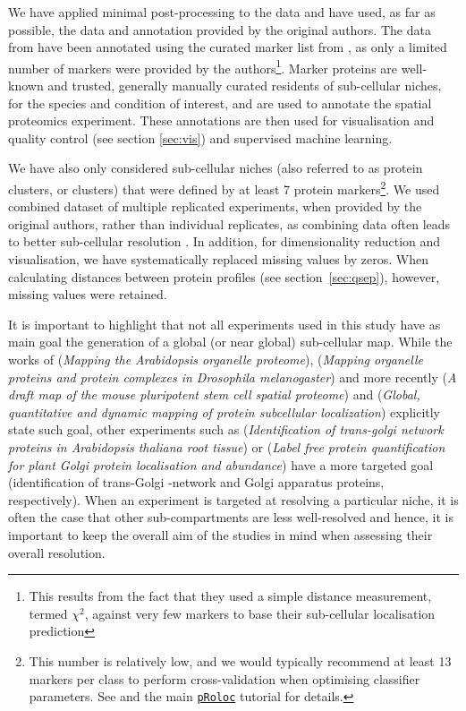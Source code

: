\documentclass[12pt]{article}\usepackage[]{graphicx}\usepackage[]{color}
\newcommand{\Rpackage}[1]{\texttt{#1}}
\newcommand\Biocpkg[1]{%
  {\href{http://bioconductor.org/packages/#1}%
    {\Rpackage{#1}}}}
\begin{document}
We have applied minimal post-processing to the data and have used, as
far as possible, the data and annotation provided by the original
authors. The data from \citet{Foster:2006} have been annotated using
the curated marker list from \citet{Christoforou:2016}, as only a
limited number of markers were provided by the authors\footnote{This
  results from the fact that they used a simple distance measurement,
  termed $\chi^2$, against very few markers to base their sub-cellular
  localisation prediction}. Marker proteins are well-known and
trusted, generally manually curated residents of sub-cellular niches,
for the species and condition of interest, and are used to annotate
the spatial proteomics experiment. These annotations are then used for
visualisation and quality control (see section \ref{sec:vis}) and
supervised machine learning.

We have also only considered sub-cellular niches (also referred to as
protein clusters, or clusters) that were defined by at least 7 protein
markers\footnote{This number is relatively low, and we would typically
  recommend at least 13 markers per class to perform cross-validation
  when optimising classifier parameters. See \citet{Gatto:2014} and
  the main \Biocpkg{pRoloc} tutorial for details.}. We used combined
dataset of multiple replicated experiments, when provided by the
original authors, rather than individual replicates, as combining data
often leads to better sub-cellular resolution \citep{Trotter:2010}.
In addition, for dimensionality reduction and visualisation, we have
systematically replaced missing values by zeros. When calculating
distances between protein profiles (see section~\ref{sec:qsep}),
however, missing values were retained.






It is important to highlight that not all experiments used in this
study have as main goal the generation of a global (or near global)
sub-cellular map. While the works of \citet{Dunkley:2006}
(\textit{Mapping the Arabidopsis organelle proteome}),
\citet{Tan:2009} (\textit{Mapping organelle proteins and protein
  complexes in Drosophila melanogaster}) and more recently
\citet{Christoforou:2016} (\textit{A draft map of the mouse
  pluripotent stem cell spatial proteome}) and \citet{Itzhak:2016}
(\textit{Global, quantitative and dynamic mapping of protein
  subcellular localization}) explicitly state such goal, other
experiments such as \citet{Groen:2014} (\textit{Identification of
  trans-golgi network proteins in Arabidopsis thaliana root tissue})
or \citet{Nikolovski:2014} (\textit{Label free protein quantification
  for plant Golgi protein localisation and abundance}) have a more
targeted goal (identification of trans-Golgi -network and Golgi
apparatus proteins, respectively). When an experiment is targeted at
resolving a particular niche, it is often the case that other
sub-compartments are less well-resolved and hence, it is important to
keep the overall aim of the studies in mind when assessing their
overall resolution.
\end{document}

